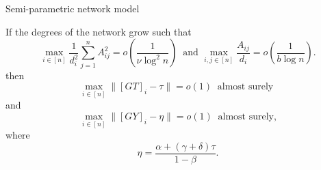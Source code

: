 \documentclass[final]{beamer}
\newlength{\colwidth}
\begin{document}
\begin{frame}[t]
\begin{columns}[t]
\begin{column}{\colwidth}
\begin{block}{Semi-parametric network model}
\begin{lemma}
                    If the degrees of the network grow such that
                    \begin{equation} \label{eq:growth:nub}
                        \max_{i \in [n] } \frac{1}{d_i^2} \sum_{j=1}^n A_{ij}^2
                        = o\left( \frac{ 1 }{ \nu \log^2 n } \right)
                        ~\text{ and }
                        \max_{i,j \in [n]} \frac{ A_{ij} }{ d_i }
                        = o\left( \frac{ 1 }{ b \log n } \right).
                    \end{equation}
                    then
                    \begin{equation*}
                        \max_{i \in [n]} \Big\| [GT]_i - \tau \Big\|
                        = o(1) ~ \text{ almost surely }
                    \end{equation*}
                    and
                    \begin{equation*}
                        \max_{i \in [n]} \Big\| [GY]_i - \eta \Big\|
                        = o(1) ~ \text{ almost surely,}
                    \end{equation*}
                    where
                    \begin{equation} \label{eq:def:eta}
                        \eta = \frac{ \alpha + (\gamma+\delta)\tau }{ 1-\beta }.
                    \end{equation}
                \end{lemma}



\end{block}
\end{column}
\end{columns}
\end{frame}
\end{document}
